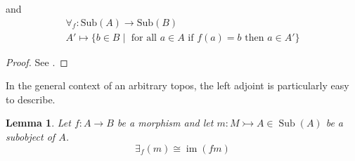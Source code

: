 \documentclass{birkjour}
\theoremstyle{plain}
\newtheorem{lemma}[thm]{Lemma}
\theoremstyle{definition}
\newcommand{\lto}{\longrightarrow}
\begin{document}
	and
	\begin{gather*}
		\forall_f: \text{Sub}(A) \to \text{Sub}(B)\\
		A' \mapsto \lbrace b \in B \mid \text{ for all }a \in A\text{ if }f(a) = b\text{ then }a \in A'\rbrace
	\end{gather*}
	\begin{proof}
		See \cite[\S1 9.2]{MM}.
	\end{proof}
	In the general context of an arbitrary topos, the left adjoint is particularly easy to describe.
	\begin{lemma}
		Let $f:A \lto B$ be a morphism and let $m: M \rightarrowtail A \in \operatorname{Sub}(A)$ be a subobject of $A$.
		\begin{equation}
			\exists_f(m) \cong \operatorname{im}(fm)
		\end{equation}
	\end{lemma}
\end{document}
